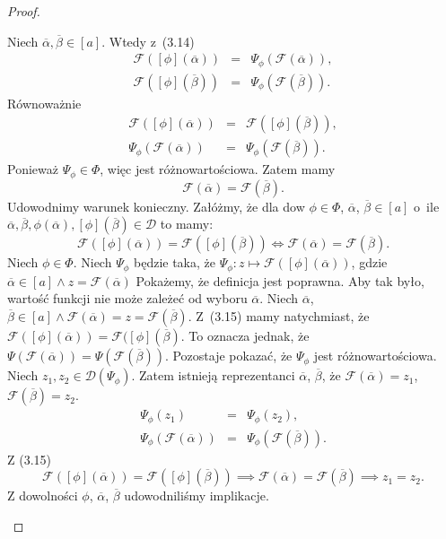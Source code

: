 \documentclass[12pt,a4paper]{report}
\newcommand{\domkniecie}[1]{\left[ {#1} \right] }
\begin{document}
\begin{proof}
\begin{enumerate}
Niech $\overline{\alpha}, \overline{\beta} \in \domkniecie{a}$. Wtedy z~(3.14)
\begin{eqnarray*}
\mathcal{F}(\domkniecie{\phi}(\overline{\alpha}))&=&\Psi_{\phi}(\mathcal{F}(\overline{\alpha})),\\
\mathcal{F}(\domkniecie{\phi}(\overline{\beta}))&=&\Psi_{\phi}(\mathcal{F}(\overline{\beta})).
\end{eqnarray*}
Równoważnie
\begin{eqnarray*}
\mathcal{F}(\domkniecie{\phi}(\overline{\alpha}))&=&\mathcal{F}(\domkniecie{\phi}(\overline{\beta})),\\
\Psi_{\phi}(\mathcal{F}(\overline{\alpha}))&=&\Psi_{\phi}(\mathcal{F}(\overline{\beta})).
\end{eqnarray*}
Ponieważ $\Psi_{\phi} \in \Phi$, więc jest różnowartościowa. Zatem mamy
$$
\mathcal{F}(\overline{\alpha})=\mathcal{F}(\overline{\beta}).
$$
Udowodnimy warunek konieczny. Załóżmy, że dla dow $\phi \in \Phi$, $\overline{\alpha}$, $\overline{\beta} \in \domkniecie{a}$ o~ile $\overline{\alpha}, \overline{\beta}, \phi(\overline{\alpha}), \domkniecie{\phi}(\overline{\beta}) \in \mathcal{D}$ to mamy:
\begin{equation}
\mathcal{F}(\domkniecie{\phi}(\overline{\alpha}))=\mathcal{F}(\domkniecie{\phi}(\overline{\beta})) \iff \mathcal{F}(\overline{\alpha})=\mathcal{F}(\overline{\beta}).
\end{equation}
Niech $\phi \in \Phi$. Niech $\Psi_{\phi}$ będzie taka, że $\Psi_{\phi}: z\longmapsto \mathcal{F}(\domkniecie{\phi}(\overline{\alpha}))$, gdzie $\overline{\alpha} \in \domkniecie{a} \land z=\mathcal{F}(\overline{\alpha})$
Pokażemy, że definicja jest poprawna. Aby tak było, wartość funkcji nie może zależeć od wyboru $\overline{\alpha}$. 
Niech $\overline{\alpha}$, $\overline{\beta} \in \domkniecie{a} \land \mathcal{F}(\overline{\alpha})=z=\mathcal{F}(\overline{\beta})$. Z~(3.15) mamy natychmiast, że $\mathcal{F}(\domkniecie{\phi}(\overline{\alpha}))=\mathcal{F}(\domkniecie{\phi}(\overline{\beta})$. To oznacza jednak, że $\Psi(\mathcal{F}(\overline{\alpha}))=\Psi(\mathcal{F}(\overline{\beta}))$. Pozostaje pokazać, że $\Psi_{\phi}$ jest różnowartościowa. Niech $z_1, z_2 \in \mathcal{D}(\Psi_{\phi})$. Zatem istnieją reprezentanci $\overline{\alpha}$, $\overline{\beta}$, że $\mathcal{F}(\overline{\alpha})=z_1$, $\mathcal{F}(\overline{\beta})=z_2$.
\begin{eqnarray*}
\Psi_{\phi}(z_1)&=&\Psi_{\phi}(z_2),\\
\Psi_{\phi}(\mathcal{F}(\overline{\alpha}))&=&\Psi_{\phi}(\mathcal{F}(\overline{\beta})).
\end{eqnarray*}
Z (3.15)
$$
\mathcal{F}(\domkniecie{\phi}(\overline{\alpha}))=\mathcal{F}(\domkniecie{\phi}(\overline{\beta})) \implies \mathcal{F}(\overline{\alpha})=\mathcal{F}(\overline{\beta}) \implies z_1=z_2.
$$
Z dowolności $\phi$, $\overline{\alpha}$, $\overline{\beta}$ udowodniliśmy implikacje.
\end{enumerate}
\end{proof}
\end{document}
